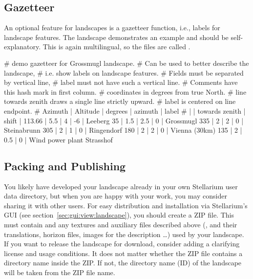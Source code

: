 \subsection{Gazetteer}
\label{sec:landscapes:Gazetteer}

An optional feature for landscapes is a gazetteer function, i.e., labels for
landscape features. The  landscape demonstrates
an example and should be self-explanatory. This is again multilingual,
so the files are called .

\begin{configfileScr}
# demo gazetteer for Grossmugl landscape.
# Can be used to better describe the landscape,
# i.e. show labels on landscape features.
# Fields must be separated by vertical line,
# label must not have such a vertical line.
# Comments have this hash mark in first column.
# coordinates in degrees from true North.
# line towards zenith draws a single line strictly upward.
# label is centered on line endpoint.
# Azimuth | Altitude | degrees        | azimuth | label
#         |          | towards zenith |  shift  |
113.66    | 5.5      |     4          |   -6    | Leeberg
35        | 1.5      |     2.5        |    0    | Grossmugl
335       | 2        |     2          |    0    | Steinabrunn
305       | 2        |     1          |    0    | Ringendorf
180       | 2        |     2          |    0    | Vienna (30km)
135       | 2        |     0.5        |    0    | Wind power plant Strasshof
\end{configfileScr}

\subsection{Packing and Publishing}
\label{sec:landscapes:Packing}

You likely have developed your landscape already in your own Stellarium user data directory, but when you are happy with your work,
you may consider sharing it with other users.
For easy distribution and installation via Stellarium's GUI (see section~\ref{sec:gui:view:landscape}), you should create a ZIP file.
This must contain  and any textures and auxiliary files described above (, 
and their translations, horizon files, images for the description  \ldots) used by your landscape.
If you want to release the landscape for download, consider adding a  clarifying license and usage conditions.
It does not matter whether the ZIP file contains a directory name inside the ZIP. If not, the directory name (ID) of the
landscape will be taken from the ZIP file name.

